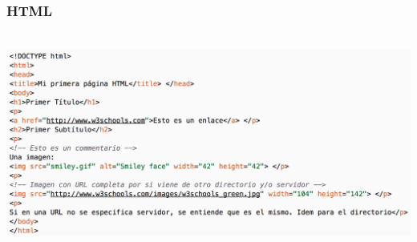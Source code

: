 \documentclass[hyperref={pdfpagelabels=true},ucs]{beamer}
\begin{document}

\begin{frame}[fragile]
\frametitle{HTML}

~\hspace{-5mm}\includegraphics[width=1.1\textwidth]{figs/html-sample}











\end{frame}

\end{document}
